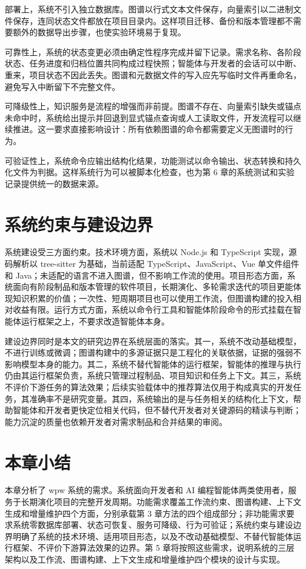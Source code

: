 部署上，系统不引入独立数据库。图谱以行式文本文件保存，向量索引以二进制文件保存，连同状态文件都放在项目目录内。这样项目迁移、备份和版本管理都不需要额外的数据导出步骤，也使实验环境易于复现。

可靠性上，系统的状态变更必须由确定性程序完成并留下记录。需求名称、各阶段状态、任务进度和归档位置共同构成过程快照；智能体与开发者的会话可以中断、重来，项目状态不因此丢失。图谱和元数据文件的写入应先写临时文件再重命名，避免写入中断留下不完整文件。

可降级性上，知识服务是流程的增强而非前提。图谱不存在、向量索引缺失或锚点未命中时，系统给出提示并回退到显式锚点查询或人工读取文件，开发流程可以继续推进。这一要求直接影响设计：所有依赖图谱的命令都需要定义无图谱时的行为。

可验证性上，系统命令应输出结构化结果，功能测试以命令输出、状态转换和持久化文件为判据。这样系统行为可以被脚本化检查，也为第 6 章的系统测试和实验记录提供统一的数据来源。


\section{系统约束与建设边界}
系统建设受三方面约束。技术环境方面，系统以 Node.js 和 TypeScript 实现，源码解析以 tree-sitter 为基础，当前适配 TypeScript、JavaScript、Vue 单文件组件和 Java；未适配的语言不进入图谱，但不影响工作流的使用。项目形态方面，系统面向有阶段制品和版本管理的软件项目，长期演化、多轮需求迭代的项目更能体现知识积累的价值；一次性、短周期项目也可以使用工作流，但图谱构建的投入相对收益有限。运行方式方面，系统以命令行工具和智能体阶段命令的形式挂载在智能体运行框架之上，不要求改造智能体本身。

建设边界同时是本文的研究边界在系统层面的落实。其一，系统不改动基础模型，不进行训练或微调；图谱构建中的多源证据只是工程化的关联依据，证据的强弱不影响模型本身的能力。其二，系统不替代智能体的运行框架，智能体的推理与执行仍由其运行框架负责，系统只管理过程制品、项目知识和任务上下文。其三，系统不评价下游任务的算法效果；后续实验载体中的推荐算法仅用于构成真实的开发任务，其准确率不是研究变量。其四，系统输出的是与任务相关的结构化上下文，帮助智能体和开发者更快定位相关代码，但不替代开发者对关键源码的精读与判断；能力沉淀的质量也依赖开发者对需求制品和合并结果的审阅。


\section{本章小结}
本章分析了 wpw 系统的需求。系统面向开发者和 AI 编程智能体两类使用者，服务于长期演化项目的完整开发周期。功能需求覆盖工作流约束、图谱构建、上下文生成和增量维护四个方面，分别承载第 3 章方法的四个组成部分；非功能需求要求系统零数据库部署、状态可恢复、服务可降级、行为可验证；系统约束与建设边界明确了系统的技术环境、适用项目形态，以及不改动基础模型、不替代智能体运行框架、不评价下游算法效果的边界。第 5 章将按照这些需求，说明系统的三层架构以及工作流、图谱构建、上下文生成和增量维护四个模块的设计与实现。
